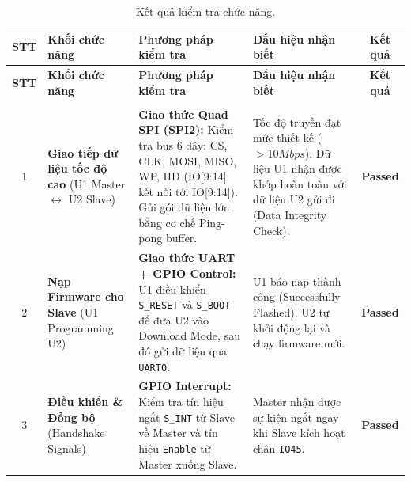                 \begin{longtable}{|c|p{}|p{}|p{}|c|}
                    \caption{Kết quả kiểm tra chức năng.}
                    \label{tab:detailed_functional_verification_final} \\
                    \hline
                    \textbf{STT} & \textbf{Khối chức năng} & \textbf{Phương pháp kiểm tra} & \textbf{Dấu hiệu nhận biết} & \textbf{Kết quả} \\ \hline
                    \endfirsthead
                    \hline
                    \textbf{STT} & \textbf{Khối chức năng} & \textbf{Phương pháp kiểm tra} & \textbf{Dấu hiệu nhận biết} & \textbf{Kết quả} \\ \hline
                    \endhead
                    \hline
                    \endfoot
                    \endlastfoot
        
                    \multicolumn{5}{|l|}{\textbf{A. GIAO TIẾP VI ĐIỀU KHIỂN}} \\ \hline
        
                    1 & \textbf{Giao tiếp dữ liệu tốc độ cao} \newline (U1 Master $\leftrightarrow$ U2 Slave) & \textbf{Giao thức Quad SPI (SPI2):} \newline Kiểm tra bus 6 dây: CS, CLK, MOSI, MISO, WP, HD (IO[9:14] kết nối tới IO[9:14]). Gửi gói dữ liệu lớn bằng cơ chế Ping-pong buffer. & Tốc độ truyền đạt mức thiết kế ($> 10Mbps$). Dữ liệu U1 nhận được khớp hoàn toàn với dữ liệu U2 gửi đi (Data Integrity Check). & \textcolor{modern_blue}{\textbf{Passed}} \\ \hline
        
                    2 & \textbf{Nạp Firmware cho Slave} \newline (U1 Programming U2) & \textbf{Giao thức UART + GPIO Control:} \newline U1 điều khiển \texttt{S\_RESET} và \texttt{S\_BOOT} để đưa U2 vào Download Mode, sau đó gửi dữ liệu qua \texttt{UART0}. & U1 báo nạp thành công (Successfully Flashed). U2 tự khởi động lại và chạy firmware mới. & \textcolor{modern_blue}{\textbf{Passed}} \\ \hline
        
                    3 & \textbf{Điều khiển \& Đồng bộ} \newline (Handshake Signals) & \textbf{GPIO Interrupt:} \newline Kiểm tra tín hiệu ngắt \texttt{S\_INT} từ Slave về Master và tín hiệu \texttt{Enable} từ Master xuống Slave. & Master nhận được sự kiện ngắt ngay khi Slave kích hoạt chân \texttt{IO45}. & \textcolor{modern_blue}{\textbf{Passed}} \\ \hline
        

\end{longtable}
